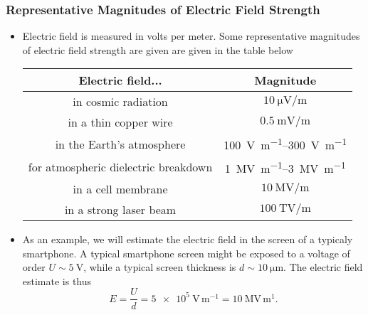 \documentclass[11pt, a4paper]{article}
\begin{document}
\subsubsection{Representative Magnitudes of Electric Field Strength}
\begin{itemize}
    \item Electric field is measured in volts per meter. Some representative magnitudes of electric field strength are given are given in the table below
    \begin{center}
        \begin{tabular}{c|c}
            Electric field... & Magnitude \\
            \hline
            in cosmic radiation & $ \SI{10}{\micro \volt \per \meter} $\\
            in a thin copper wire & $ \SI{0.5}{\milli \volt \per \meter} $\\
            in the Earth's atmosphere & \SIrange{100}{300}{\volt \per \meter} \\
            for atmospheric dielectric breakdown & \SIrange{1}{3}{\mega \volt \per \meter}\\
            in a cell membrane & $ \SI{10}{\mega \volt \per \meter} $\\
            in a strong laser beam & $ \SI{100}{\tera \volt \per \meter} $\\
        \end{tabular}
    \end{center}

    \item As an example, we will estimate the electric field in the screen of a typicaly smartphone. A typical smartphone screen might be exposed to a voltage of order $ U \sim \SI{5}{\volt} $, while a typical screen thickness is $ d \sim \SI{10}{\micro \meter} $. The electric field estimate is thus
    \begin{equation*}
        E = \frac{U}{d} = \SI{5e5}{\volt \, \meter^{-1}} = \SI{10}{\mega \volt \, \meter^{1}}.
    \end{equation*}
    \end{itemize}
\end{document}
